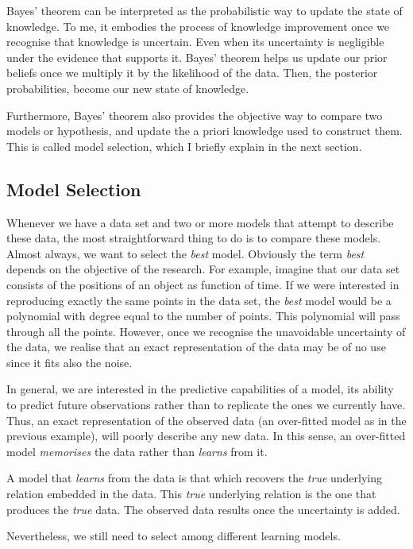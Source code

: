 Bayes' theorem can be interpreted as the probabilistic way to update the state of knowledge. To me, it embodies the process of knowledge improvement once we recognise that knowledge is uncertain. Even when its uncertainty is negligible under the evidence that supports it. Bayes' theorem helps us update our prior beliefs once we multiply it by the likelihood of the data. Then, the posterior probabilities, become our new state of knowledge. 

Furthermore, Bayes' theorem also provides the objective way to compare two models or hypothesis, and update the a priori knowledge used to construct them. This is called model selection, which I  briefly explain in the next section.

\subsection{Model Selection}
\label{sect:modelselection}

Whenever we have a data set and two or more models that attempt to describe these data, the most straightforward thing to do is to compare these models. Almost always, we want to select the \emph{best} model. Obviously the term \emph{best} depends on the objective of the research. For example, imagine that our data set consists of the positions of an object as function of time. If we were interested in reproducing exactly the same points in the data set, the \emph{best} model would be a polynomial with degree equal to the number of points. This polynomial will pass through all the points. However, once we recognise the unavoidable uncertainty of the data, we realise that an exact representation of the data may be of no use since it fits also the noise. 

In general, we are interested in the predictive capabilities of a model, its ability to predict future observations rather than to replicate the ones we currently have. Thus, an exact representation of the observed data (an over-fitted model as in the previous example), will poorly describe any new data. In this sense, an over-fitted model \emph{memorises} the data rather than \emph{learns} from it.

A model that \emph{learns} from the data is that which recovers the \emph{true} underlying relation embedded in the data. This \emph{true} underlying relation is the one that produces the \emph{true} data. The observed data results once the uncertainty is added. 

Nevertheless, we still need to select among different learning models.  

